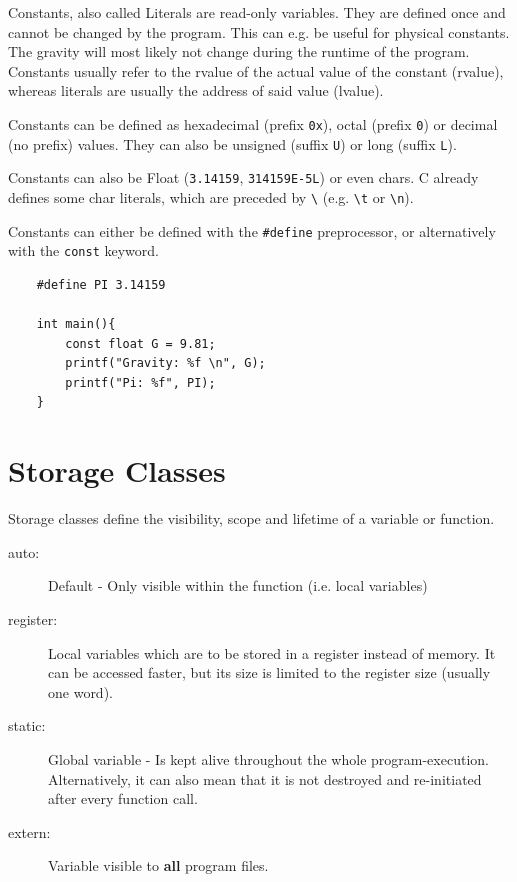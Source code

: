 \documentclass[a4paper, 11pt]{article}
\newcommand{\code}[1]{\texttt{#1}}
\begin{document}
Constants, also called Literals are read-only variables. They are defined once and cannot be changed by the program. This can e.g. be useful for physical constants. The gravity will most likely not change during the runtime of the program. Constants usually refer to the rvalue of the actual value of the constant (rvalue), whereas literals are usually the address of said value (lvalue).

Constants can be defined as hexadecimal (prefix \code{0x}), octal (prefix \code{0}) or decimal (no prefix) values. They can also be unsigned (suffix \code{U}) or long (suffix \code{L}). 




\vspace{10px}
\begin{minipage}{0.45\textwidth}
    Constants can also be Float (\code{3.14159}, \code{314159E-5L}) or even chars. C already defines some char literals, which are preceded by \code{\textbackslash} (e.g. \code{\textbackslash t} or \code{\textbackslash n}).

    Constants can either be defined with the \code{\#define} preprocessor, or alternatively with the \code{const} keyword. 
\end{minipage}\hfill
\begin{minipage}{0.45\textwidth}
    \begin{lstlisting}
    #define PI 3.14159

    int main(){
        const float G = 9.81;
        printf("Gravity: %f \n", G);
        printf("Pi: %f", PI);
    }
    \end{lstlisting}
\end{minipage}

\section{Storage Classes}

Storage classes define the visibility, scope and lifetime of a variable or function.

\begin{description}
    \item[auto: ] Default - Only visible within the function (i.e. local variables)
    \item[register: ] Local variables which are to be stored in a register instead of memory. It can be accessed faster, but its size is limited to the register size (usually one word).
    \item[static: ] Global variable - Is kept alive throughout the whole program-execution. Alternatively, it can also mean that it is not destroyed and re-initiated after every function call.
    \item[extern: ] Variable visible to \textbf{all} program files.
\end{description}
\end{document}
